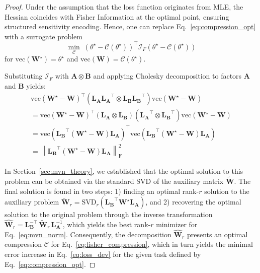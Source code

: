 \documentclass{article}
\begin{document}
\begin{proof}
Under the assumption that the loss function originates from MLE, the Hessian coincides with Fisher Information at the optimal point, ensuring structured sensitivity encoding. Hence, one can replace Eq.~\ref{eq:compression_opt} with a surrogate problem
\begin{equation}\label{eq:fisher_compression}
    \underset{\mathcal{C}}{\min}\;\left(\theta^\star - \mathcal{C}\left(\theta^\star\right)\right)^\top \mathcal{I}_F \left(\theta^\star - \mathcal{C}\left(\theta^\star\right)\right)
\end{equation}
for $\text{vec}(\mathbf{W}^\star)=\theta^\star$ and $\text{vec}(\mathbf{W})=\mathcal{C}(\theta^\star)$.

Substituting  $\mathcal{I}_F$ with $\mathbf{A} \otimes \mathbf{B}$ and applying Cholesky decomposition to factors $\mathbf{A}$ and $\mathbf{B}$ yields:
\begin{gather}
    \mathrm{vec}(\mathbf{W^{\star}} - \mathbf{W})^\top (\mathbf{L_A} \mathbf{L_A}^\top \otimes \mathbf{L_B} \mathbf{L_B}^\top) \mathrm{vec}(\mathbf{W^{\star}} - \mathbf{W}) \nonumber\\
    = \mathrm{vec}(\mathbf{W^{\star}} - \mathbf{W})^\top (\mathbf{L_A} \otimes \mathbf{L_B}) (\mathbf{L_A}^\top \otimes \mathbf{L_B}^\top) \mathrm{vec}(\mathbf{W^{\star}} - \mathbf{W}) \nonumber\\
    = \mathrm{vec} (\mathbf{L_B}^\top (\mathbf{W^{\star}} - \mathbf{W}) \mathbf{L_A})^\top \mathrm{vec} (\mathbf{L_B}^\top (\mathbf{W^{\star}} - \mathbf{W}) \mathbf{L_A}) \nonumber\\
    = \left\| \mathbf{L_B}^\top \left(\mathbf{W}^{\star} -  \mathbf{W}\right)\mathbf{L_A} \right\|_{\operatorname{F}}^2
    \label{eq:mvn_norm}
\end{gather}

In Section~\ref{sec:mvn_theory}, we established that the optimal solution to this problem can be obtained via the standard SVD of the auxiliary matrix $\widetilde{\mathbf{W}}$. The final solution is found in two steps: 1) finding an optimal rank-$r$ solution to the auxiliary problem $\widetilde{\mathbf{W}}_r=\mathrm{SVD}_r(\mathbf{L_B}^\top  \mathbf{W}^{\star}\mathbf{L_A})$, and 2) recovering the optimal solution to the original problem through the inverse transformation $\widehat{\mathbf{W}}_r=\mathbf{L}_\mathbf{B}^{-\top} \, \widetilde{\mathbf{W}}_r \, \mathbf{L}_\mathbf{A}^{-1}$, which yields the best rank-$r$ minimizer for Eq.~\ref{eq:mvn_norm}.
Consequently, the decomposition $\widehat{\mathbf{W}}_r$ presents an optimal compression $\mathcal{C}$ for Eq.~\ref{eq:fisher_compression}, which  in turn yields the minimal error increase in Eq.~\ref{eq:loss_dev} for the given task defined by Eq.~\ref{eq:compression_opt}.
\renewcommand\qedsymbol{$\blacksquare$}
\end{proof}
\end{document}
